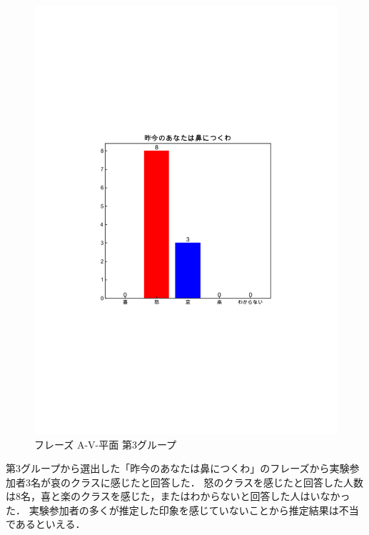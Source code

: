 \begin{figure}[H]
    \centering
    \includegraphics[width=14cm]{439.pdf}
    \vspace{-1mm}
    \caption{フレーズ A-V-平面 第3グループ}
    \label{fig:mms}
    \vspace{5mm}
\end{figure}
第3グループから選出した「昨今のあなたは鼻につくわ」のフレーズから実験参加者3名が哀のクラスに感じたと回答した．
怒のクラスを感じたと回答した人数は8名，喜と楽のクラスを感じた，またはわからないと回答した人はいなかった．
実験参加者の多くが推定した印象を感じていないことから推定結果は不当であるといえる．
\newpage
